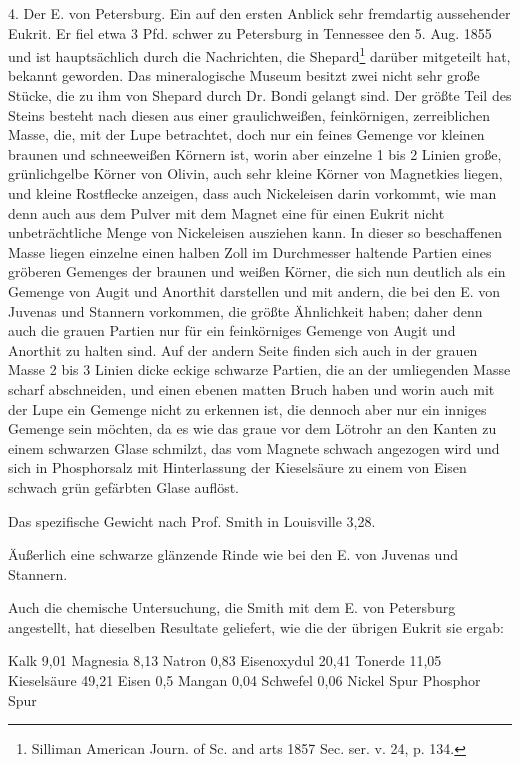 \documentclass[a4paper, 11pt, oneside]{article}
\begin{document}
4. Der E. von Petersburg. Ein auf den ersten Anblick sehr fremdartig aussehender Eukrit. Er fiel etwa 3 Pfd. schwer zu Petersburg in Tennessee den 5. Aug. 1855 und ist hauptsächlich durch die Nachrichten, die Shepard\footnote{Silliman American Journ. of Sc. and arts 1857 Sec. ser. v. 24, p. 134.} darüber mitgeteilt hat, bekannt geworden. Das mineralogische Museum besitzt zwei nicht sehr große Stücke, die zu ihm von Shepard durch Dr. Bondi gelangt sind. Der größte Teil des Steins besteht nach diesen aus einer graulichweißen, feinkörnigen, zerreiblichen Masse, die, mit der Lupe betrachtet, doch nur ein feines Gemenge vor kleinen braunen und schneeweißen Körnern ist, worin aber einzelne 1 bis 2 Linien große, grünlichgelbe Körner von Olivin, auch sehr kleine Körner von Magnetkies liegen, und kleine Rostflecke anzeigen, dass auch Nickeleisen darin vorkommt, wie man denn auch aus dem Pulver mit dem Magnet eine für einen Eukrit nicht unbeträchtliche Menge von Nickeleisen ausziehen kann. In dieser so beschaffenen Masse liegen einzelne einen halben Zoll im Durchmesser haltende Partien eines gröberen Gemenges der braunen und weißen Körner, die sich nun deutlich als ein Gemenge von Augit und Anorthit darstellen und mit andern, die bei den E. von Juvenas und Stannern vorkommen, die größte Ähnlichkeit haben; daher denn auch die grauen Partien nur für ein feinkörniges Gemenge von Augit und Anorthit zu halten sind. Auf der andern Seite finden sich auch in der grauen Masse 2 bis 3 Linien dicke eckige schwarze Partien, die an der umliegenden Masse scharf abschneiden, und einen ebenen matten Bruch haben und worin auch mit der Lupe ein Gemenge nicht zu erkennen ist, die dennoch aber nur ein inniges Gemenge sein möchten, da es wie das graue vor dem Lötrohr an den Kanten zu einem schwarzen Glase schmilzt, das vom Magnete schwach angezogen wird und sich in Phosphorsalz mit Hinterlassung der Kieselsäure zu einem von Eisen schwach grün gefärbten Glase auflöst.

Das spezifische Gewicht nach Prof. Smith in Louisville 3,28.

Äußerlich eine schwarze glänzende Rinde wie bei den E. von Juvenas und Stannern.

Auch die chemische Untersuchung, die Smith mit dem E. von Petersburg angestellt, hat dieselben Resultate geliefert, wie die der übrigen Eukrit sie ergab:

Kalk 9,01  
Magnesia 8,13  
Natron 0,83  
Eisenoxydul 20,41  
Tonerde 11,05  
Kieselsäure 49,21  
Eisen 0,5  
Mangan 0,04  
Schwefel 0,06  
Nickel Spur   
Phosphor Spur  
\end{document}
